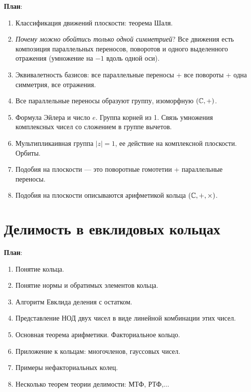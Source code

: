 
\textbf{План}:
\begin{enumerate}
\item Классификация движений плоскости: теорема Шаля.
\item \textit{Почему можно обойтись только одной симметрией}? Все движения есть композиция параллельных переносов, поворотов и одного выделенного отражения (умножение на $-1$ вдоль одной оси).
\item Эквивалетность базисов: все параллельные переносы + все повороты + одна симметрия, все отражения.
\item Все параллельные переносы образуют группу, изоморфную $(\mathbb C,+)$.
\item Формула Эйлера и число $e$. Группа корней из 1. Связь умножения комплексных чисел со сложением в группе вычетов.
\item Мультипликаивная группа $|z|=1$, ее действие на комплексной плоскости. Орбиты.
\item Подобия на плоскости --- это поворотные гомотетии + параллельные переносы.
\item Подобия на плоскости описываются арифметикой кольца $(\mathbb C,+,\times)$.
\end{enumerate}



\section{Делимость в евклидовых кольцах}


\textbf{План}:
\begin{enumerate}
\item Понятие кольца.
\item Понятие нормы и обратимых элементов кольца.
\item Алгоритм Евклида деления с остатком.
\item Представление НОД двух чисел в виде линейной комбинации этих чисел.
\item Основная теорема арифметики. Факториальное кольцо.
\item Приложение к кольцам: многочленов, гауссовых чисел.
\item Примеры нефакториальных колец.
\item Несколько теорем теории делимости: МТФ, РТФ,...
\end{enumerate}














